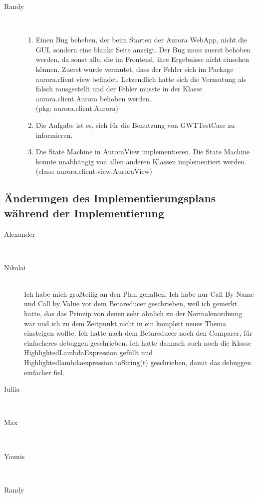 \documentclass[parskip=full,11pt,twoside]{scrartcl}
\begin{document}
\begin{description}
    \item [Randy]\hfill \\
    \begin{enumerate}
    \item Einen Bug beheben, der beim Starten der Aurora WebApp, nicht die GUI, sondern eine blanke Seite anzeigt. Der Bug muss zuerst behoben werden, da sonst alle, die im Frontend, ihre Ergebnisse nicht einsehen können. Zuerst wurde vermutet, dass der Fehler sich im Package aurora.client.view befindet. Letzendlich hatte sich die Vermutung als falsch rausgestellt und der Fehler musste in der Klasse aurora.client.Aurora behoben werden. \\(pkg: aurora.client.Aurora)
    \item Die Aufgabe ist es, sich für die Benutzung von GWTTestCase zu informieren. 
    \item Die State Machine in AuroraView implementieren. Die State Machine konnte unabhängig von allen anderen Klassen implementiert werden. \\(class: aurora.client.view.AuroraView) 

    \end{enumerate}
\end{description}


\subsection{Änderungen des Implementierungsplans während der Implementierung}

\begin{description}

\item [Alexander]\hfill \\
\item [Nikolai]\hfill \\
Ich habe mich großteilig an den Plan gehalten, Ich habe nur Call By Name und Call by Value vor dem Betareducer geschrieben, weil ich gemerkt hatte, das das Prinzip von denen sehr ähnlich zu der Normalenordnung war und ich zu dem Zeitpunkt nicht in ein komplett neues Thema einsteigen wollte.
Ich hatte nach dem Betareducer noch den Comparer, für einfacheres debuggen geschrieben. Ich hatte dannach auch noch die Klasse HighlightedLambdaExpression gefüllt und  Highlightedlambdaexpression.toString(t) geschrieben, damit das debuggen einfacher fiel.
\item [Iuliia]\hfill \\
\item [Max]\hfill \\
\item [Younis]\hfill \\
\item [Randy]\hfill \\
\end{description}
\end{document}

